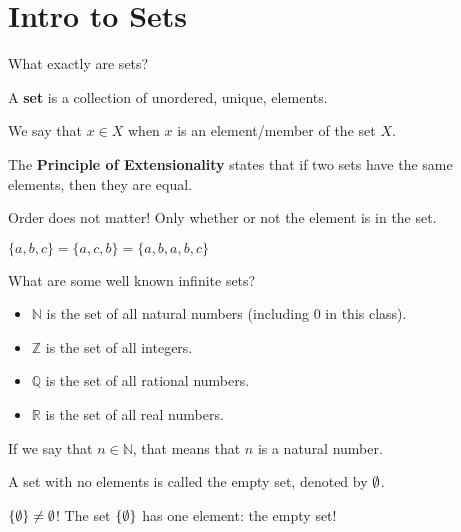 
\section{Intro to Sets}

What exactly are sets?

\begin{definition}
	A \textbf{set} is a collection of unordered, unique, elements.
\end{definition}

\begin{notation}
	We say that \( x \in  X \) when \( x \) is an element/member of the set \( X \).
\end{notation}

\begin{definition}
	The \textbf{Principle of Extensionality} states that if two sets have the same elements, then they are equal.
\end{definition}

\begin{note}
	Order does not matter! Only whether or not the element is in the set.
\end{note}

\begin{eg}
	\( \{a, b, c\} = \{a, c, b\} =\{a, b, a, b, c\}     \)
\end{eg}

What are some well known infinite sets?
\begin{itemize}
	\item \( \mathbb{N} \) is the set of all natural numbers (including 0 in this class).
	\item \( \mathbb{Z} \) is the set of all integers.
	\item \( \mathbb{Q} \) is the set of all rational numbers.
	\item \( \mathbb{R} \) is the set of all real numbers.
\end{itemize}

\begin{notation}
	If we say that \( n \in \mathbb{N} \), that means that \( n \) is a natural number.
\end{notation}

\begin{definition}
	A set with no elements is called the empty set, denoted by \( \emptyset \).
\end{definition}

\begin{note}
	\( \{\emptyset\} \neq \emptyset  \)! The set \( \{\emptyset\}   \) has one element: the empty set!
\end{note}


